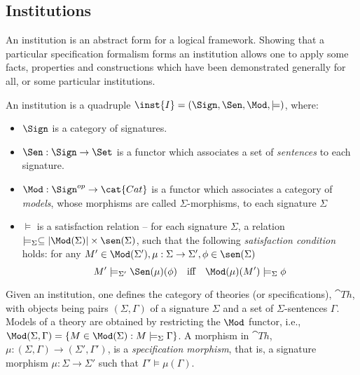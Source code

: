 \subsection{Institutions}\label{sub:inst}
An institution \cite{inst} is an abstract form for a logical framework. Showing that a particular
specification formalism forms an institution allows one to apply some 
facts, properties and constructions which have been demonstrated generally for all, or some
particular institutions.
%
\begin{definition}\label{de:inst}%
An institution is a quadruple $\inst{I} = (\Sign,\Sen,\Mod,\models)$, where:
\begin{itemize}\MyLPar
\item $\Sign$ is a category of signatures.  
\item $\Sen: \Sign \to \Set$ is a functor which associates a set of {\it sentences} to each signature.
\item $\Mod:\Sign^{op} \to \cat{Cat}$ is a functor which associates a
category of {\it models}, whose morphisms are called $\Sigma$-morphisms, to
each signature $\Sigma$
\item $\models$ is a satisfaction relation -- for each signature $\Sigma$, a relation
 $\models_{\Sigma} \subseteq |\Mod(\Sigma)| \times
\sen(\Sigma)$, such that the following {\it satisfaction condition} holds:
for any $M' \in \Mod(\Sigma'), \mu: \Sigma \to \Sigma' , \phi \in \sen(\Sigma)$
  \[ M' \models_{\Sigma'} \Sen(\mu)(\phi)\ \  \mbox{ iff }\ \ \Mod(\mu)(M') \models_{\Sigma} \phi\]
	\end{itemize}
\end{definition}
%
Given an institution, one defines the category of theories (or
specifications), $\cat{Th}$, with objects being pairs $(\Sigma,\Gamma)$ of a
signature $\Sigma$ and a set of $\Sigma$-sentences $\Gamma$. Models of a
theory are obtained by restricting the $\Mod$ functor, i.e.,
$\Mod(\Sigma,\Gamma)=\{M\in\Mod(\Sigma):M\models_\Sigma\Gamma\}$. A morphism
in $\cat{Th}$, $\mu:(\Sigma,\Gamma)\to(\Sigma',\Gamma')$, 
is a {\em specification morphism}, that is, a signature morphism
$\mu:\Sigma\to\Sigma'$ such that $\Gamma'\models\mu(\Gamma)$. 

